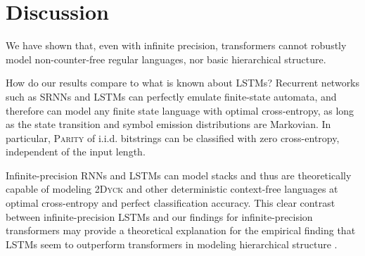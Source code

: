 \documentclass[11pt,a4paper]{article}
\begin{document}




\section{Discussion}\label{sec:discussion}

We have shown that, even with infinite precision, transformers cannot robustly model non-counter-free regular languages, nor basic hierarchical structure.

How do our results compare to what is known about LSTMs?
Recurrent networks such as SRNNs and LSTMs can perfectly emulate finite-state automata, and therefore can model any finite state language with optimal cross-entropy, as long as the state transition and symbol emission distributions are Markovian.
In particular, \textsc{Parity} of i.i.d. bitstrings can be classified with zero cross-entropy, independent of the input length.

Infinite-precision RNNs and LSTMs can model stacks \cite{tabor2000fractal,gruning2006stack,kirov2012processing,korsky2019computational} and thus are theoretically capable of modeling \textsc{2Dyck} and other deterministic context-free languages at optimal cross-entropy and perfect classification accuracy. %
This clear contrast between infinite-precision LSTMs and our findings for infinite-precision transformers may provide a theoretical explanation for the empirical finding that LSTMs seem to outperform transformers in modeling hierarchical structure \citep{tran2018importance}.



\end{document}
